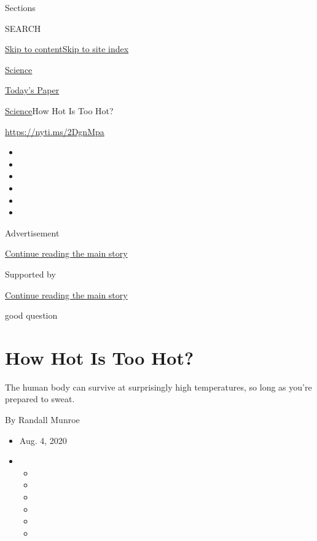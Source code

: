 Sections

SEARCH

\protect\hyperlink{site-content}{Skip to
content}\protect\hyperlink{site-index}{Skip to site index}

\href{https://www.nytimes3xbfgragh.onion/section/science}{Science}

\href{https://myaccount.nytimes3xbfgragh.onion/auth/login?response_type=cookie\&client_id=vi}{}

\href{https://www.nytimes3xbfgragh.onion/section/todayspaper}{Today's
Paper}

\href{/section/science}{Science}\textbar{}How Hot Is Too Hot?

\url{https://nyti.ms/2DgnMpa}

\begin{itemize}
\item
\item
\item
\item
\item
\item
\end{itemize}

Advertisement

\protect\hyperlink{after-top}{Continue reading the main story}

Supported by

\protect\hyperlink{after-sponsor}{Continue reading the main story}

good question

\hypertarget{how-hot-is-too-hot}{%
\section{How Hot Is Too Hot?}\label{how-hot-is-too-hot}}

The human body can survive at surprisingly high temperatures, so long as
you're prepared to sweat.

By Randall Munroe

\begin{itemize}
\item
  Aug. 4, 2020
\item
  \begin{itemize}
  \item
  \item
  \item
  \item
  \item
  \item
  \end{itemize}
\end{itemize}

